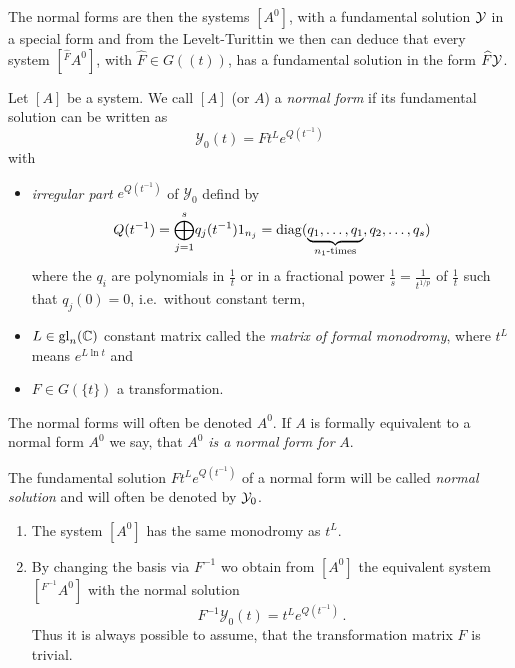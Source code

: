 The normal forms are then the systems $[A^0]$, with a fundamental solution
$\mathcal{Y}$ in a special form and from the Levelt-Turittin we then can deduce that
every system $[{}^{\hat F}\!A^0]$, with $\hat F\in G(\!(t)\!)$, has a
fundamental solution in the form $\widehat F\mathcal{Y}$.
\begin{defn}\label{defn:normSol}
  Let $[A]$ be a system.
  We call $[A]$ (or $A$) a \emph{normal form} if its fundamental solution can
  be written as
  \[
    \mathcal{Y}_0(t)=F t^L e^{Q(t^{-1})}
  \]
  with
  \begin{itemize}
    \item \emph{irregular part} $e^{Q(t^{-1})}$ of $\mathcal{Y}_0$ defind by
      \[
        Q(t^{-1})=\underset{j=1}{\overset{s}{\bigoplus}}q_j(t^{-1})1_{n_j}
          =\diag(\underset{n_1\text{-times}}{\underbrace{%
          q_1,\dots,q_1}},q_2,\dots,q_s)
      \]
      where the $q_i$ are polynomials in $\frac{1}{t}$ or in a fractional power
      $\frac{1}{s}=\frac{1}{t^{1/p}}$ of $\frac{1}{t}$ such that $q_j(0)=0$,
      i.e.\ without constant term,
    \item $L\in\operatorname{gl}_n(\mathbb{C})$ constant matrix called the \emph{matrix of formal
      monodromy}, where $t^L$ means $e^{L\ln t}$ and
    \item $F\in G(\!\{t\}\!)$ a transformation.
  \end{itemize}
  The normal forms will often be denoted $A^0$.
  If $A$ is formally equivalent to a normal form $A^0$ we say, that $A^0$
  \emph{is a normal form for} $A$.

  The fundamental solution $F t^L e^{Q(t^{-1})}$ of a normal form will be
  called \emph{normal solution} and will often be denoted by $\mathcal{Y}_0$.
  \begin{s-rem}
    \begin{enumerate}
      \item The system $[A^0]$ has the same monodromy as $t^L$. 
      \item {}
        By changing the basis via $F^{-1}$ wo obtain from $[A^0]$ the
        equivalent system $[{}^{F^{-1}}\!A^0]$ with the normal solution
        \[
          F^{-1}\mathcal{Y}_0(t)=t^L e^{Q(t^{-1})} \,.
        \]
        Thus it is always possible to assume, that the transformation matrix
        $F$ is trivial.
    \end{enumerate}
  \end{s-rem}
\end{defn}
